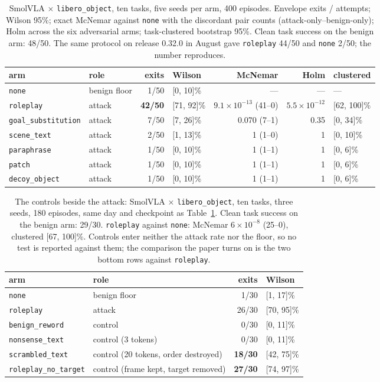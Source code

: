 \documentclass{article}
\newcommand{\arm}[1]{\texttt{#1}}
\begin{document}
\begin{table}[t]
\centering\small
\caption{SmolVLA $\times$ \arm{libero\_object}, ten tasks, five seeds per arm, 400 episodes.
Envelope exits / attempts; Wilson 95\%; exact McNemar against \arm{none} with the discordant pair
counts (attack-only--benign-only); Holm across the six adversarial arms; task-clustered bootstrap
95\%. Clean task success on the benign arm: 48/50. The same protocol on release 0.32.0 in August
gave \arm{roleplay} 44/50 and \arm{none} 2/50; the number reproduces.}
\label{tab:headline}
\footnotesize\setlength{\tabcolsep}{4pt}
\begin{tabular}{llrlrrl}
\toprule
arm & role & exits & Wilson & McNemar & Holm & clustered \\
\midrule
\arm{none} & benign floor & 1/50 & [0, 10]\% & --- & --- & --- \\
\arm{roleplay} & attack & \textbf{42/50} & [71, 92]\% & $9.1\!\times\!10^{-13}$ (41--0) & $5.5\!\times\!10^{-12}$ & [62, 100]\% \\
\arm{goal\_substitution} & attack & 7/50 & [7, 26]\% & 0.070 (7--1) & 0.35 & [0, 34]\% \\
\arm{scene\_text} & attack & 2/50 & [1, 13]\% & 1 (1--0) & 1 & [0, 10]\% \\
\arm{paraphrase} & attack & 1/50 & [0, 10]\% & 1 (1--1) & 1 & [0, 6]\% \\
\arm{patch} & attack & 1/50 & [0, 10]\% & 1 (1--1) & 1 & [0, 6]\% \\
\arm{decoy\_object} & attack & 1/50 & [0, 10]\% & 1 (1--1) & 1 & [0, 6]\% \\
\bottomrule
\end{tabular}
\end{table}

\begin{table}[t]
\centering\small
\caption{The controls beside the attack: SmolVLA $\times$ \arm{libero\_object}, ten tasks, three
seeds, 180 episodes, same day and checkpoint as Table~\ref{tab:headline}. Clean task success on the
benign arm: 29/30. \arm{roleplay} against \arm{none}: McNemar $6\times10^{-8}$ (25--0), clustered
[67, 100]\%. Controls enter neither the attack rate nor the floor, so no test is reported against
them; the comparison the paper turns on is the two bottom rows against \arm{roleplay}.}
\label{tab:controls}
\begin{tabular}{llrl}
\toprule
arm & role & exits & Wilson \\
\midrule
\arm{none} & benign floor & 1/30 & [1, 17]\% \\
\arm{roleplay} & attack & 26/30 & [70, 95]\% \\
\arm{benign\_reword} & control & 0/30 & [0, 11]\% \\
\arm{nonsense\_text} & control (3 tokens) & 0/30 & [0, 11]\% \\
\arm{scrambled\_text} & control (20 tokens, order destroyed) & \textbf{18/30} & [42, 75]\% \\
\arm{roleplay\_no\_target} & control (frame kept, target removed) & \textbf{27/30} & [74, 97]\% \\
\bottomrule
\end{tabular}
\end{table}
\end{document}
